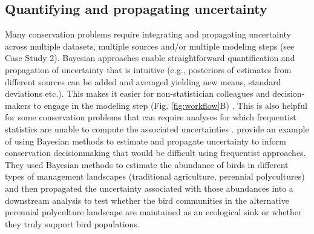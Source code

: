 \documentclass{article}
\begin{document}
\subsection*{Quantifying and propagating uncertainty} 
\par  Many conservation problems require integrating and propagating uncertainty across multiple datasets, multiple sources and/or multiple modeling steps (see Case Study 2). Bayesian approaches enable straightforward quantification and  propagation of  uncertainty \citep[e.g.,][]{stern2022interweaving, draper1995assessment,gilbert2023propagating} that is intuitive  %
(e.g., posteriors of estimates from different sources can be added and averaged yielding new means, standard deviations etc.). This makes it easier for non-statistician colleagues and decision-makers to engage in the modeling step (Fig. \ref{fig:workflow}B) \citep{fornacon2021bayesian}. This is also helpful for some conservation problems that can require analyses for which frequentist statistics are unable to compute the associated uncertainties \citep{bolker2009a,bates2006r}.   \cite{Eyster2022} provide an example of using Bayesian methods to estimate and propagate uncertainty to inform conservation decisionmaking that would be difficult using frequentist approaches. They used Bayesian methods to estimate the abundance of birds in different types of management landscapes (traditional agriculture, perennial polycultures) and then propagated the uncertainty associated with those abundances into a downstream analysis to test whether the bird communities in the alternative perennial polyculture landscape are maintained as an ecological sink or whether they truly support bird populations. 
\end{document}
